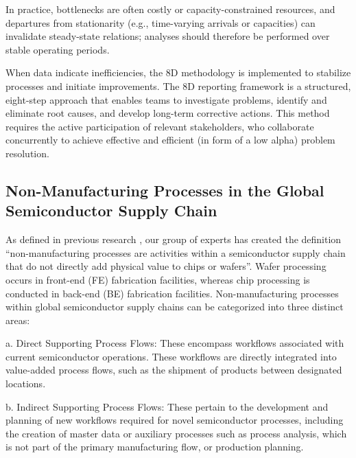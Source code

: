 \documentclass[preprint,12pt,authoryear]{elsarticle}
\begin{document}


In practice, bottlenecks are often costly or capacity-constrained resources, and departures from stationarity (e.g., time-varying arrivals or capacities) can invalidate steady-state relations; analyses should therefore be performed over stable operating periods.

When data indicate inefficiencies, the 8D methodology \citep{visser2017-8d} is implemented to stabilize processes and initiate improvements. The 8D reporting framework is a structured, eight-step approach that enables teams to investigate problems, identify and eliminate root causes, and develop long-term corrective actions. This method requires the active participation of relevant stakeholders, who collaborate concurrently to achieve effective and efficient (in form of a low alpha) problem resolution.
    



           
\subsection{Non-Manufacturing Processes in the Global Semiconductor Supply Chain}\label{subsec:Non-Manufacturing Processes in the Global Semiconductor Supply Chain}

As defined in previous research \citep{LauterEhmReiner2025}, our group of experts has created the definition ``non-manufacturing processes are activities within a semiconductor supply chain that do not directly add physical value to chips or wafers''. Wafer processing occurs in front-end (FE) fabrication facilities, whereas chip processing is conducted in back-end (BE) fabrication facilities. Non-manufacturing processes within global semiconductor supply chains can be categorized into three distinct areas:

a. Direct Supporting Process Flows: These encompass workflows associated with current semiconductor operations. These workflows are directly integrated into value-added process flows, such as the shipment of products between designated locations.

b. Indirect Supporting Process Flows: These pertain to the development and planning of new workflows required for novel semiconductor processes, including the creation of master data or auxiliary processes such as process analysis, which is not part of the primary manufacturing flow, or production planning.
\end{document}
